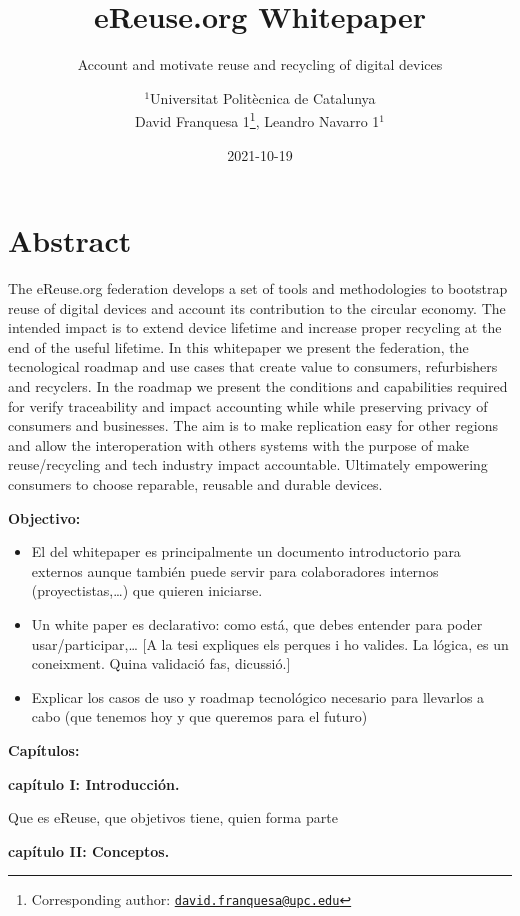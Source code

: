 \documentclass[
]{book}
\title{eReuse.org Whitepaper}
\subtitle{Account and motivate reuse and recycling of digital devices}
\author{\(^1\)Universitat Politècnica de Catalunya\\
David Franquesa 1\footnote{Corresponding author: \href{mailto:david.franquesa@upc.edu}{\nolinkurl{david.franquesa@upc.edu}}}, Leandro Navarro 1\(^1\)}
\date{2021-10-19}
\begin{document}
\maketitle

{
\setcounter{tocdepth}{1}
\tableofcontents
}
\hypertarget{abstract}{%
\chapter*{Abstract}\label{abstract}}

The eReuse.org federation develops a set of tools and methodologies to bootstrap reuse of digital devices and account its contribution to the circular economy. The intended impact is to extend device lifetime and increase proper recycling at the end of the useful lifetime. In this whitepaper we present the federation, the tecnological roadmap and use cases that create value to consumers, refurbishers and recyclers. In the roadmap we present the conditions and capabilities required for verify traceability and impact accounting while while preserving privacy of consumers and businesses. The aim is to make replication easy for other regions and allow the interoperation with others systems with the purpose of make reuse/recycling and tech industry impact accountable. Ultimately empowering consumers to choose reparable, reusable and durable devices.

\textbf{Objectivo: }

\begin{itemize}
\item
  El del whitepaper es principalmente un documento introductorio para externos aunque también puede servir para colaboradores internos (proyectistas,\ldots) que quieren iniciarse.
\item
  Un white paper es declarativo: como está, que debes entender para poder usar/participar,\ldots{} {[}A la tesi expliques els perques i ho valides. La lógica, es un coneixment. Quina validació fas, dicussió.{]}
\item
  Explicar los casos de uso y roadmap tecnológico necesario para llevarlos a cabo (que tenemos hoy y que queremos para el futuro)
\end{itemize}

\textbf{Capítulos:}

\textbf{capítulo I: Introducción.}

Que es eReuse, que objetivos tiene, quien forma parte

\textbf{capítulo II: Conceptos.}
\end{document}
